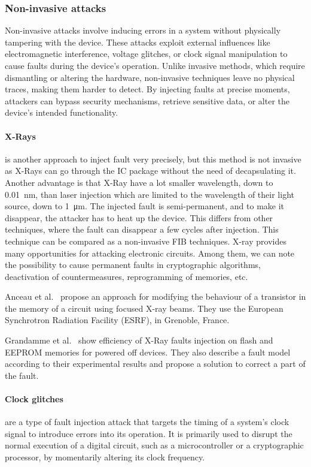 \subsubsection{Non-invasive attacks}
Non-invasive attacks involve inducing errors in a system without physically tampering with the device. These attacks exploit external influences like electromagnetic interference, voltage glitches, or clock signal manipulation to cause faults during the device's operation. Unlike invasive methods, which require dismantling or altering the hardware, non-invasive techniques leave no physical traces, making them harder to detect. By injecting faults at precise moments, attackers can bypass security mechanisms, retrieve sensitive data, or alter the device's intended functionality.

\paragraph{X-Rays} is another approach to inject fault very precisely, but this method is not invasive as X-Rays can go through the IC package without the need of decapsulating it. Another advantage is that X-Ray have a lot smaller wavelength, down to \SI{0.01}{\nano\meter}, than laser injection which are limited to the wavelength of their light source, down to \SI{1}{\micro\meter}.
The injected fault is semi-permanent, and to make it disappear, the attacker has to heat up the device. This differs from other techniques, where the fault can disappear a few cycles after injection.
This technique can be compared as a non-invasive FIB techniques. X-ray provides many opportunities for attacking electronic circuits. Among them, we can note the possibility to cause permanent faults in cryptographic algorithms, deactivation of countermeasures, reprogramming of memories, etc.

Anceau et al.~\cite{ABCMRT-17-ches, BAMCST-23-dft} propose an approach for modifying the behaviour of a transistor in the memory of a circuit using focused X-ray beams. 
They use the European Synchrotron Radiation Facility (ESRF), in Grenoble, France.

Grandamme et al.~\cite{GBD-23-paine} show efficiency of X-Ray faults injection on flash and EEPROM memories for powered off devices. They also describe a fault model according to their experimental results and propose a solution to correct a part of the fault.

\paragraph{Clock glitches} are a type of fault injection attack that targets the timing of a system's clock signal to introduce errors into its operation. It is primarily used to disrupt the normal execution of a digital circuit, such as a microcontroller or a cryptographic processor, by momentarily altering its clock frequency.

